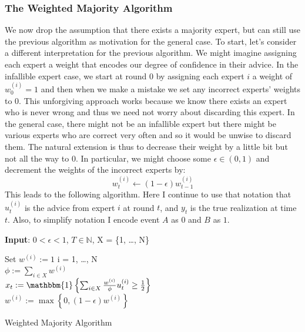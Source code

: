 \documentclass[12pt]{article}
\begin{document}
\subsubsection{The Weighted Majority Algorithm}
We now drop the assumption that there exists a majority expert, but can still use the previous algorithm as motivation for the general case. To start, let's consider a different interpretation for 
the previous algorithm. We might imagine assigning each expert a weight that encodes our degree of confidence in their advice. In the infallible expert case, we start at round $0$ by assigning each expert
$i$ a weight of $w^{(i)}_0 = 1$ and then when we make a mistake we set any incorrect experts' weights to $0$. This unforgiving approach works because we know there exists an expert who is never wrong and
thus we need not worry about discarding this expert. In the general case, there might not be an infallible expert but there might be various experts who are correct very often and so it would be unwise 
to discard them. The natural extension is thus to decrease their weight by a little bit but not all the way to $0$. In particular, we might choose some $\epsilon \in (0, 1)$ and decrement the weights of the incorrect
experts by: 
\[w^{(i)}_{t} \gets (1 - \epsilon) w^{(i)}_{t - 1}\]
This leads to the following algorithm. Here I continue to use that notation that $u_t^{(i)}$ is the advice from expert $i$ at round $t$, and $y_t$ is the true realization at time $t$. Also, to simplify notation I encode 
event $A$ as $0$ and $B$ as $1$. 
\bigskip

 \begin{algorithm}[H]
	\SetAlgoLined
	
	\textbf{Input}: $0 < \epsilon < 1$, $T \in \mathbb{N}$,  X = \{1, \dots, N\} \\
	
	\bigskip
	
	Set $w^{(i)} := 1$  i = 1, \dots, N \\
	
	 {
		$\phi := \sum_{i \in X} w^{(i)}$ \\
		$x_t := \mathbbm{1}\left\{\sum_{i \in X} \frac{w^{(i)}}{\phi} u_t^{(i)} \geq \frac{1}{2} \right\}$ \\
		
		 {
			 {
					$w^{(i)} := \max\left\{0, (1 - \epsilon)w^{(i)}\right\}$ \\
			}
		}
	}			
\caption{Weighted Majority Algorithm}
\end{algorithm}
\end{document}
